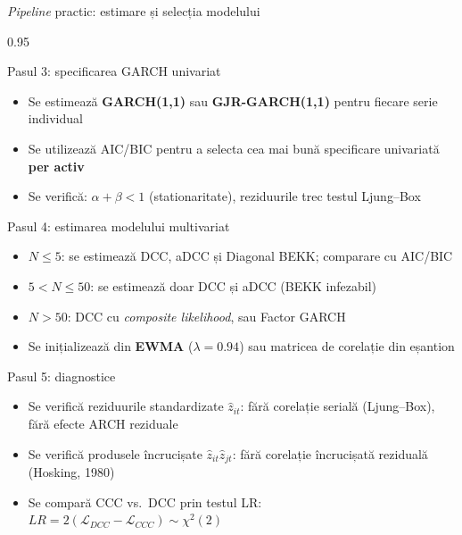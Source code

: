 \documentclass[9pt, aspectratio=169, t]{beamer}
\begin{document}
\begin{frame}{\textit{Pipeline} practic: estimare și selecția modelului}
    \begin{cminipage}{0.95\textwidth}
    \vspace{-2mm}
    {\scriptsize
    \begin{block}{Pasul 3: specificarea GARCH univariat}
        \begin{itemize}\setlength{\itemsep}{0pt}
            \item Se estimează \textbf{GARCH(1,1)} sau \textbf{GJR-GARCH(1,1)} pentru fiecare serie individual
            \item Se utilizează AIC/BIC pentru a selecta cea mai bună specificare univariată \textbf{per activ}
            \item Se verifică: $\alpha + \beta < 1$ (stationaritate), reziduurile trec testul Ljung--Box
        \end{itemize}
    \end{block}
    \vspace{-1mm}
    \begin{block}{Pasul 4: estimarea modelului multivariat}
        \begin{itemize}\setlength{\itemsep}{0pt}
            \item \textbf{$N \leq 5$}: se estimează DCC, aDCC și Diagonal BEKK; comparare cu AIC/BIC
            \item \textbf{$5 < N \leq 50$}: se estimează doar DCC și aDCC (BEKK infezabil)
            \item \textbf{$N > 50$}: DCC cu \textit{composite likelihood}, sau Factor GARCH
            \item Se inițializează din \textbf{EWMA} ($\lambda = 0.94$) sau matricea de corelație din eșantion
        \end{itemize}
    \end{block}
    \vspace{-1mm}
    \begin{block}{Pasul 5: diagnostice}
        \begin{itemize}\setlength{\itemsep}{0pt}
            \item Se verifică reziduurile standardizate $\hat{z}_{it}$: fără corelație serială (Ljung--Box), fără efecte ARCH reziduale
            \item Se verifică produsele încrucișate $\hat{z}_{it}\hat{z}_{jt}$: fără corelație încrucișată reziduală (Hosking, 1980)
            \item Se compară CCC vs.\ DCC prin testul LR: $LR = 2(\mathcal{L}_{DCC} - \mathcal{L}_{CCC}) \sim \chi^2(2)$
        \end{itemize}
    \end{block}
    }
    \end{cminipage}
\end{frame}
\end{document}
